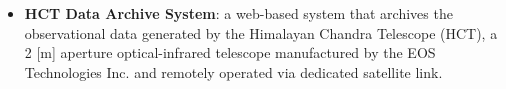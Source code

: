 \begin{itemize}










\item \textbf{HCT Data Archive System}:
a web-based system that archives the observational data generated by the
Himalayan Chandra Telescope (HCT), a 2 [m] aperture optical-infrared telescope
manufactured by the EOS Technologies Inc. and remotely operated via dedicated
satellite link.

\end{itemize}

